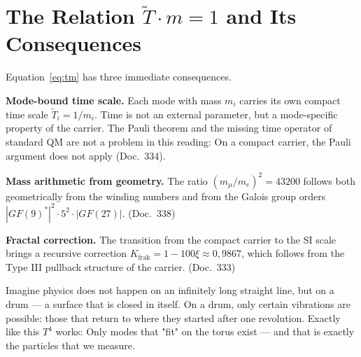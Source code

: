 \section{The Relation $\tilde T\cdot m = 1$ and Its Consequences}

Equation~\eqref{eq:tm} has three immediate consequences.

\textbf{Mode-bound time scale.} Each mode with mass $m_i$ carries
its own compact time scale $\tilde T_i = 1/m_i$. Time
is not an external parameter, but a mode-specific property of the
carrier. The Pauli theorem and the missing time operator of standard QM
are not a problem in this reading: On a compact carrier, the
Pauli argument does not apply (Doc.~334).

\textbf{Mass arithmetic from geometry.} The ratio
$(m_\mu/m_e)^2 = 43200$ follows both geometrically from the
winding numbers and from the Galois group orders
$|GF(9)^*|^2\cdot 5^2\cdot|GF(27)|$. (Doc.~338)

\textbf{Fractal correction.} The transition from the compact carrier to the
SI scale brings a recursive correction
$K_{\mathrm{frak}} = 1 - 100\xi \approx 0{,}9867$, which follows from the
Type III pullback structure of the carrier. (Doc.~333)

\begin{laierspur}
Imagine physics does not happen on an infinitely long
straight line, but on a drum — a surface that
is closed in itself. On a drum, only certain
vibrations are possible: those that return to where they started after one revolution. Exactly like this $T^4$ works:
Only modes that "fit" on the torus exist — and that is
exactly the particles that we measure.
\end{laierspur}
